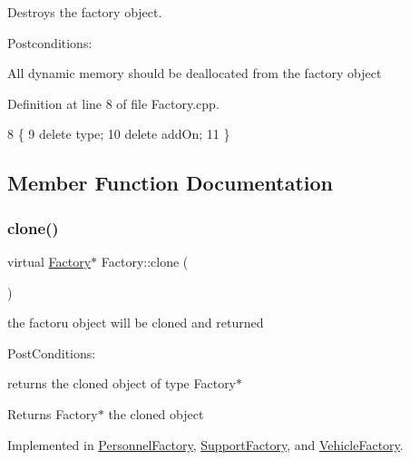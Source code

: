 Destroys the factory object. 

Postconditions\+:
\begin{DoxyItemize}
\item All dynamic memory should be deallocated from the factory object 
\end{DoxyItemize}

Definition at line 8 of file Factory.\+cpp.


\begin{DoxyCode}
8                   \{
9     \textcolor{keyword}{delete} type;
10     \textcolor{keyword}{delete} addOn;
11 \}
\end{DoxyCode}


\subsection{Member Function Documentation}
\mbox{\label{classFactory_a00881ec5050751e4b747db5dfd266192}} 
\subsubsection{\texorpdfstring{clone()}{clone()}}
{\footnotesize\ttfamily virtual \hyperlink{classFactory}{Factory}$\ast$ Factory\+::clone (\begin{DoxyParamCaption}{ }\end{DoxyParamCaption})\hspace{0.3cm}{\ttfamily [pure virtual]}}



the factoru object will be cloned and returned 

Post\+Conditions\+:
\begin{DoxyItemize}
\item returns the cloned object of type Factory$\ast$
\end{DoxyItemize}

\begin{DoxyReturn}{Returns}
Factory$\ast$ the cloned object 
\end{DoxyReturn}


Implemented in \hyperlink{classPersonnelFactory_ad60e8371e52153294112b16a7a97cc2d}{Personnel\+Factory}, \hyperlink{classSupportFactory_a802c25e901b479656ea95a5678a1ad26}{Support\+Factory}, and \hyperlink{classVehicleFactory_a6d874e37b573b491a49e303209ac42cd}{Vehicle\+Factory}.

\mbox{\label{classFactory_a994153930f59cafb280e91d5b100b5aa}} 
